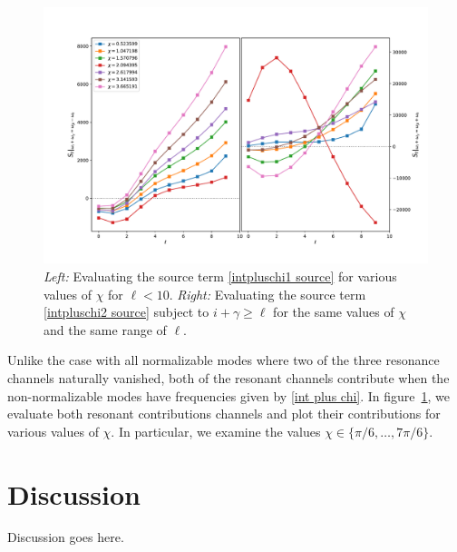 \documentclass[letterpaper,11pt]{article}
\begin{document}
\begin{figure}[h!]
\centering
	\includegraphics[width=\textwidth]{./figures/IntPlusChi}
	\caption{{\it Left:} Evaluating the source term \eqref{intpluschi1 source} for various values of $\chi$ for $\ell < 10$. {\it Right:} Evaluating the source term \eqref{intpluschi2 source} subject to $i + \gamma \geq \ell$ for the same values of $\chi$ and the same range of $\ell$.}
	\label{fig: twoiplusx}
\end{figure}

Unlike the case with all normalizable modes where two of the three resonance channels naturally vanished, both of the resonant channels contribute when the non-normalizable modes have frequencies given by \eqref{int plus chi}. In figure~\ref{fig: twoiplusx}, we evaluate both resonant contributions channels and plot their contributions for various values of $\chi$. In particular, we examine the values $\chi \in \{ \pi/6, \ldots, 7\pi/6 \}$.



\section{Discussion}
\label{sec: discussion}

Discussion goes here.




\appendix
\end{document}
